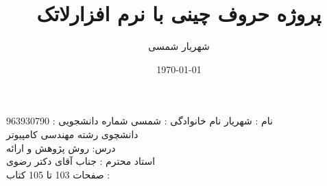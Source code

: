 \documentclass[a4 paper,12pt]{article}\usepackage{xepersian}
\title{پروژه حروف چینی با نرم افزارلاتک}
\author{شهریار شمسی}
\date{\today}
\begin{document}
\maketitle



\noindent
نام : شهریار  نام خانوادگی : شمسی          شماره دانشجویی : 963930790 \\ دانشچوی رشته مهندسی کامپیوتر  \\ درس:  روش پژوهش و ارائه  \\ استاد محترم : جناب آقای دکتر رضوی \\

\noindent
 صفحات 103 تا 105  کتاب :                                                                                                                                                                                                                                                                                                                                                          \

\vspace{0.1cm}
\vspace{0.1cm}
\end{document}
